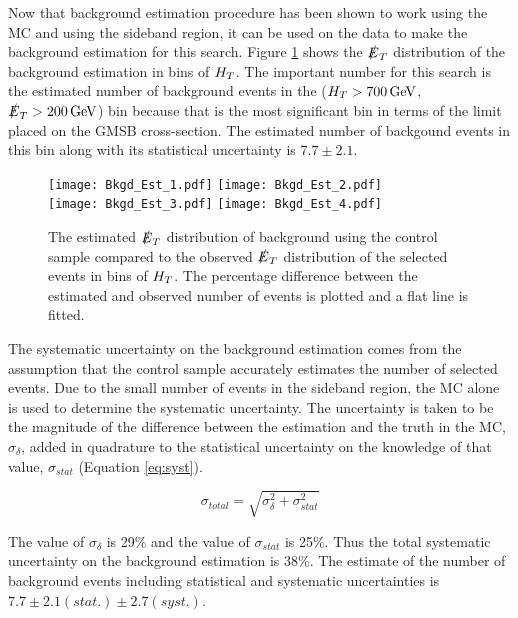 Now that background estimation procedure has been shown to work using the MC and
using the sideband region, it can be used on the data to make the background
estimation for this search. Figure \ref{fig:Bkgd_Est} shows the $\slashed{E}_{T}$
distribution of the background estimation in bins of $H_{T}$. The important number 
for this search is the estimated number of background events in the 
($H_{T}>700\, \mathrm{GeV}$, $\slashed{E}_{T}>200\, \mathrm{GeV}$) bin because that is the most 
significant bin in terms of the limit placed on the GMSB cross-section. The 
estimated number of backgound events in this bin along with its statistical 
uncertainty is $7.7\pm2.1$. \\

\begin{figure}
\texttt{[image: Bkgd\_Est\_1.pdf]}
\texttt{[image: Bkgd\_Est\_2.pdf]}\\
\texttt{[image: Bkgd\_Est\_3.pdf]}
\texttt{[image: Bkgd\_Est\_4.pdf]}\\
\caption{The estimated $\slashed{E}_{T}$ distribution of background using the control
sample compared to the observed $\slashed{E}_{T}$ distribution of the selected events in 
bins of $H_{T}$. The percentage difference between the estimated and observed
number of events is plotted and a flat line is fitted.}
\label{fig:Bkgd_Est}
\end{figure}

The systematic uncertainty on the background estimation comes from the assumption 
that the control sample accurately estimates the number of selected events. Due
to the small number of events in the sideband region, the MC alone is used to
determine the systematic uncertainty. The uncertainty is taken to be the
magnitude of the difference between the estimation and the truth in the MC, 
$\sigma_{\delta}$, added in quadrature to the statistical uncertainty on the 
knowledge of that value, $\sigma_{stat}$ (Equation \ref{eq:syst}).

\begin{equation}
\sigma_{total} = \sqrt{\sigma_{\delta}^{2} + \sigma_{stat}^{2}}
\label{eq:syst}
\end{equation}

The value of $\sigma_{\delta}$ is 29\unit{\%} and the value of $\sigma_{stat}$
is 25\unit{\%}. Thus the total systematic uncertainty on the background 
estimation is 38\unit{\%}. The estimate of the number of background events 
including statistical and systematic uncertainties is 
$7.7\pm2.1(stat.)\pm2.7(syst.)$.

